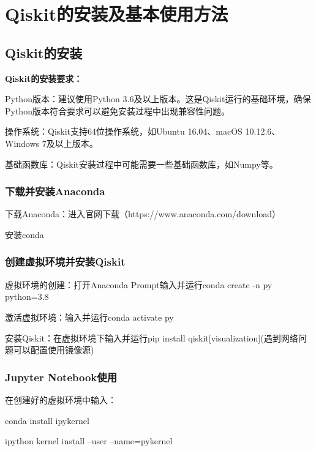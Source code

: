 \section{Qiskit的安装及基本使用方法}
\label{附录A}
\subsection{Qiskit的安装}
\textbf{Qiskit的安装要求：}

Python版本：建议使用Python 3.6及以上版本。这是Qiskit运行的基础环境，确保Python版本符合要求可以避免安装过程中出现兼容性问题。

操作系统：Qiskit支持64位操作系统，如Ubuntu 16.04、macOS 10.12.6、Windows 7及以上版本。

基础函数库：Qiskit安装过程中可能需要一些基础函数库，如Numpy等。

\subsubsection{下载并安装Anaconda}
\begin{paralist}
    \item 下载Anaconda：进入官网下载（https://www.anaconda.com/download）

    \item 安装conda 
\end{paralist}
\subsubsection{创建虚拟环境并安装Qiskit}
\begin{paralist}
    \item 虚拟环境的创建：打开Anaconda Prompt输入并运行\textsf{conda create -n py python=3.8}
    \item 激活虚拟环境：输入并运行\textsf{conda activate py}
    \item 安装Qiskit：在虚拟环境下输入并运行\textsf{pip install qiskit[visualization]}(遇到网络问题可以配置使用镜像源)
\end{paralist}
\subsubsection{Jupyter Notebook使用}
在创建好的虚拟环境中输入：
\begin{paralist}
    \item \textsf{conda install ipykernel}
    \item \textsf{ipython kernel install --user --name=pykernel}
\end{paralist}

